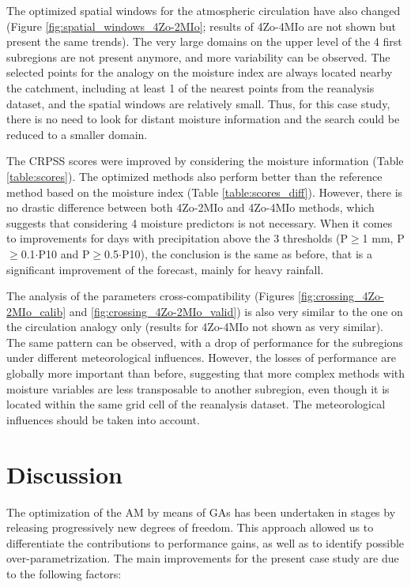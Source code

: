 \documentclass[5p]{elsarticle}
\begin{document}
The optimized spatial windows for the atmospheric circulation have also changed (Figure \ref{fig:spatial_windows_4Zo-2MIo}; results of 4Zo-4MIo are not shown but present the same trends). The very large domains on the upper level of the 4 first subregions are not present anymore, and more variability can be observed. The selected points for the analogy on the moisture index are always located nearby the catchment, including at least 1 of the nearest points from the reanalysis dataset, and the spatial windows are relatively small. Thus, for this case study, there is no need to look for distant moisture information and the search could be reduced to a smaller domain. 

The CRPSS scores were improved by considering the moisture information (Table \ref{table:scores}). The optimized methods also perform better than the reference method based on the moisture index (Table \ref{table:scores_diff}). However, there is no drastic difference between both 4Zo-2MIo and 4Zo-4MIo methods, which suggests that considering 4 moisture predictors is not necessary. When it comes to improvements for days with precipitation above the 3 thresholds (P\(\geq\)1 mm, P\(\geq\)0.1\(\cdot\)P10 and P\(\geq\)0.5\(\cdot\)P10), the conclusion is the same as before, that is a significant improvement of the forecast, mainly for heavy rainfall.

The analysis of the parameters cross-compatibility (Figures \ref{fig:crossing_4Zo-2MIo_calib} and \ref{fig:crossing_4Zo-2MIo_valid}) is also very similar to the one on the circulation analogy only (results for 4Zo-4MIo not shown as very similar). The same pattern can be observed, with a drop of performance for the subregions under different meteorological influences. However, the losses of performance are globally more important than before, suggesting that more complex methods with moisture variables are less transposable to another subregion, even though it is located within the same grid cell of the reanalysis dataset. The meteorological influences should be taken into account.


\section{Discussion}
\label{sec:discussion}

The optimization of the AM by means of GAs has been undertaken in stages by releasing progressively new degrees of freedom. This approach allowed us to differentiate the contributions to performance gains, as well as to identify possible over-parametrization. The main improvements for the present case study are due to the following factors:
\end{document}

